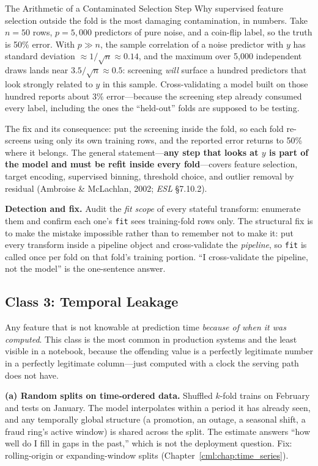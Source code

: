 \begin{mathresult}{The Arithmetic of a Contaminated Selection Step}
Why supervised feature selection outside the fold is the most damaging contamination, in numbers. Take $n = 50$ rows, $p = 5{,}000$ predictors of pure noise, and a coin-flip label, so the truth is 50\% error. With $p \gg n$, the sample correlation of a noise predictor with $y$ has standard deviation $\approx 1/\sqrt{n} \approx 0.14$, and the maximum over 5{,}000 independent draws lands near $3.5/\sqrt{n} \approx 0.5$: screening \emph{will} surface a hundred predictors that look strongly related to $y$ in this sample. Cross-validating a model built on those hundred reports about 3\% error---because the screening step already consumed every label, including the ones the ``held-out'' folds are supposed to be testing.

The fix and its consequence: put the screening inside the fold, so each fold re-screens using only its own training rows, and the reported error returns to 50\% where it belongs. The general statement---\textbf{any step that looks at $y$ is part of the model and must be refit inside every fold}---covers feature selection, target encoding, supervised binning, threshold choice, and outlier removal by residual (Ambroise \& McLachlan, 2002; \emph{ESL} \S7.10.2).
\end{mathresult}


\textbf{Detection and fix.} Audit the \emph{fit scope} of every stateful transform: enumerate them and confirm each one's \texttt{fit} sees training-fold rows only. The structural fix is to make the mistake impossible rather than to remember not to make it: put every transform inside a pipeline object and cross-validate the \emph{pipeline}, so \texttt{fit} is called once per fold on that fold's training portion. ``I cross-validate the pipeline, not the model'' is the one-sentence answer.

\subsection{Class 3: Temporal Leakage}

Any feature that is not knowable at prediction time \emph{because of when it was computed}. This class is the most common in production systems and the least visible in a notebook, because the offending value is a perfectly legitimate number in a perfectly legitimate column---just computed with a clock the serving path does not have.

\textbf{(a) Random splits on time-ordered data.} Shuffled $k$-fold trains on February and tests on January. The model interpolates within a period it has already seen, and any temporally global structure (a promotion, an outage, a seasonal shift, a fraud ring's active window) is shared across the split. The estimate answers ``how well do I fill in gaps in the past,'' which is not the deployment question. Fix: rolling-origin or expanding-window splits (Chapter~\ref{cml:chap:time_series}).

